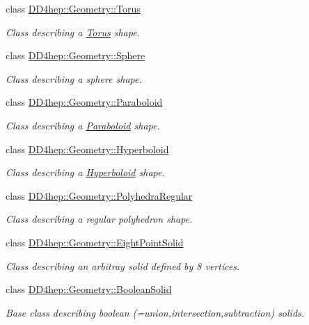 \begin{DoxyCompactItemize}
class \hyperlink{class_d_d4hep_1_1_geometry_1_1_torus}{D\+D4hep\+::\+Geometry\+::\+Torus}
\begin{DoxyCompactList}\small\item\em Class describing a \hyperlink{class_d_d4hep_1_1_geometry_1_1_torus}{Torus} shape. \end{DoxyCompactList}\item 
class \hyperlink{class_d_d4hep_1_1_geometry_1_1_sphere}{D\+D4hep\+::\+Geometry\+::\+Sphere}
\begin{DoxyCompactList}\small\item\em Class describing a sphere shape. \end{DoxyCompactList}\item 
class \hyperlink{class_d_d4hep_1_1_geometry_1_1_paraboloid}{D\+D4hep\+::\+Geometry\+::\+Paraboloid}
\begin{DoxyCompactList}\small\item\em Class describing a \hyperlink{class_d_d4hep_1_1_geometry_1_1_paraboloid}{Paraboloid} shape. \end{DoxyCompactList}\item 
class \hyperlink{class_d_d4hep_1_1_geometry_1_1_hyperboloid}{D\+D4hep\+::\+Geometry\+::\+Hyperboloid}
\begin{DoxyCompactList}\small\item\em Class describing a \hyperlink{class_d_d4hep_1_1_geometry_1_1_hyperboloid}{Hyperboloid} shape. \end{DoxyCompactList}\item 
class \hyperlink{class_d_d4hep_1_1_geometry_1_1_polyhedra_regular}{D\+D4hep\+::\+Geometry\+::\+Polyhedra\+Regular}
\begin{DoxyCompactList}\small\item\em Class describing a regular polyhedron shape. \end{DoxyCompactList}\item 
class \hyperlink{class_d_d4hep_1_1_geometry_1_1_eight_point_solid}{D\+D4hep\+::\+Geometry\+::\+Eight\+Point\+Solid}
\begin{DoxyCompactList}\small\item\em Class describing an arbitray solid defined by 8 vertices. \end{DoxyCompactList}\item 
class \hyperlink{class_d_d4hep_1_1_geometry_1_1_boolean_solid}{D\+D4hep\+::\+Geometry\+::\+Boolean\+Solid}
\begin{DoxyCompactList}\small\item\em Base class describing boolean (=union,intersection,subtraction) solids. \end{DoxyCompactList}\item 

\end{DoxyCompactItemize}

